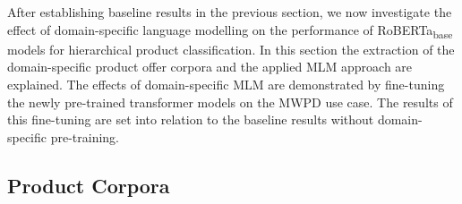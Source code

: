 \documentclass[11pt,dvipdfm]{article}
\begin{document}
After establishing baseline results in the previous section, we now investigate the effect of domain-specific language modelling on the performance of RoBERTa\textsubscript{base} models for hierarchical product classification.
In this section the extraction of the domain-specific product offer corpora and the applied \ac{MLM} approach are explained.
The effects of domain-specific \ac{MLM} are demonstrated by fine-tuning the newly pre-trained transformer models on the \ac{MWPD} use case.
The results of this fine-tuning are set into relation to the baseline results without domain-specific pre-training.

\subsection{Product Corpora}
\end{document}
